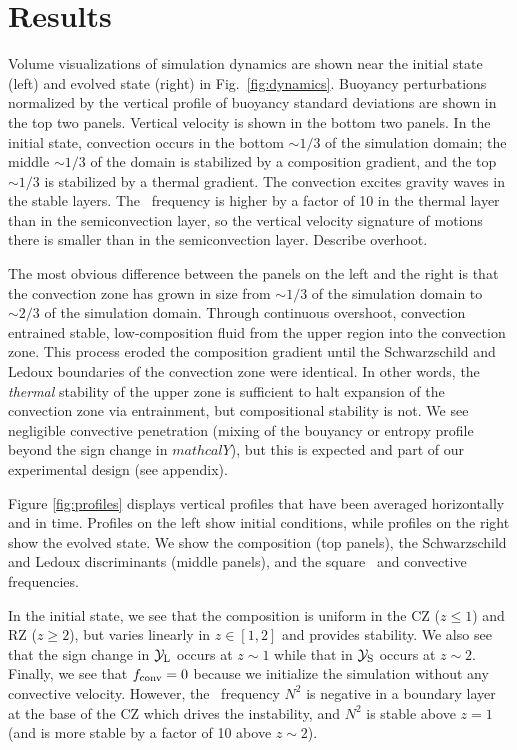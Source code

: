 \section{Results}
\label{sec:result}


Volume visualizations of simulation dynamics are shown near the initial state (left) and evolved state (right) in Fig.~\ref{fig:dynamics}.
Buoyancy perturbations normalized by the vertical profile of buoyancy standard deviations are shown in the top two panels.
Vertical velocity is shown in the bottom two panels.
In the initial state, convection occurs in the bottom $\sim1/3$ of the simulation domain; the middle $\sim1/3$ of the domain is stabilized by a composition gradient, and the top $\sim1/3$ is stabilized by a thermal gradient.
The convection excites gravity waves in the stable layers.
The \brunt$\,$ frequency is higher by a factor of 10 in the thermal layer than in the semiconvection layer, so the vertical velocity signature of motions there is smaller than in the semiconvection layer.
Describe overhoot.

The most obvious difference between the panels on the left and the right is that the convection zone has grown in size from $\sim 1/3$ of the simulation domain to $\sim 2/3$ of the simulation domain.
Through continuous overshoot, convection entrained stable, low-composition fluid from the upper region into the convection zone.
This process eroded the composition gradient until the Schwarzschild and Ledoux boundaries of the convection zone were identical.
In other words, the \emph{thermal} stability of the upper zone is sufficient to halt expansion of the convection zone via entrainment, but compositional stability is not.
We see negligible convective penetration (mixing of the bouyancy or entropy profile beyond the sign change in $mathcal{Y}$), but this is expected and part of our experimental design (see appendix).

Figure \ref{fig:profiles} displays vertical profiles that have been averaged horizontally and in time.
Profiles on the left show initial conditions, while profiles on the right show the evolved state.
We show the composition (top panels), the Schwarzschild and Ledoux discriminants (middle panels), and the square \brunt$\,$ and convective frequencies.

In the initial state, we see that the composition is uniform in the CZ ($z \leq 1$) and RZ ($z \geq 2$), but varies linearly in $z \in [1, 2]$ and provides stability.
We also see that the sign change in $\mathcal{Y}_{\rm{L}}$ occurs at $z \sim 1$ while that in $\mathcal{Y}_{\rm{S}}$ occurs at $z \sim 2$.
Finally, we see that $f_{\rm{conv}} = 0$ because we initialize the simulation without any convective velocity.
However, the \brunt$\,$ frequency $N^2$ is negative in a boundary layer at the base of the CZ which drives the instability, and $N^2$ is stable above $z = 1$ (and is more stable by a factor of 10 above $z \sim 2$).

